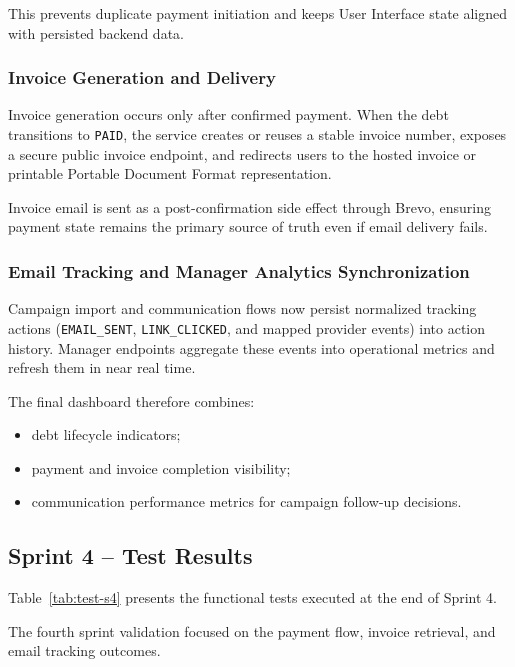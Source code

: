 ﻿\documentclass[12pt,a4paper]{report}
\begin{document}
This prevents duplicate payment initiation and keeps User Interface state aligned with persisted backend data.

\subsubsection{Invoice Generation and Delivery}

Invoice generation occurs only after confirmed payment.
When the debt transitions to \texttt{PAID}, the service creates or reuses a stable
invoice number, exposes a secure public invoice endpoint, and redirects users to the
hosted invoice or printable Portable Document Format representation.

Invoice email is sent as a post-confirmation side effect through Brevo,
ensuring payment state remains the primary source of truth even if email delivery fails.

\subsubsection{Email Tracking and Manager Analytics Synchronization}

Campaign import and communication flows now persist normalized tracking actions
(\texttt{EMAIL\_SENT}, \texttt{LINK\_CLICKED}, and mapped provider events) into action history.
Manager endpoints aggregate these events into operational metrics and refresh them in near real time.

The final dashboard therefore combines:
\begin{itemize}
  \item debt lifecycle indicators;
  \item payment and invoice completion visibility;
  \item communication performance metrics for campaign follow-up decisions.
\end{itemize}

\subsection{Sprint 4 -- Test Results}

Table~\ref{tab:test-s4} presents the functional tests executed at the end of Sprint 4.

\noindent The fourth sprint validation focused on the payment flow, invoice retrieval, and email tracking outcomes.
\end{document}
